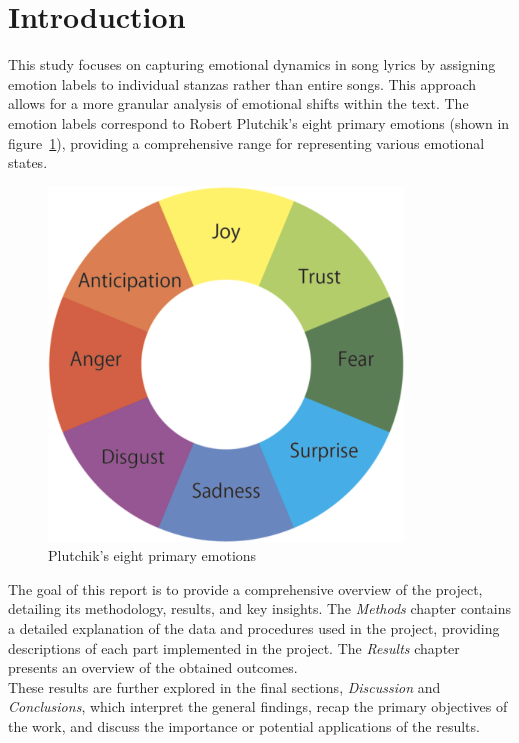 \chapter*{Introduction}
\label{ch:Introduction}
This study focuses on capturing emotional dynamics in song lyrics by assigning
emotion labels to individual stanzas rather than entire songs.
This approach allows for a more granular analysis of emotional shifts within
the text.
The emotion labels correspond to Robert Plutchik's eight primary emotions
(shown in figure~\ref{fig:primary_emotions}), providing a comprehensive range
for representing various emotional states.\\
\begin{figure}[H]
    \centering
    \includegraphics[scale= 0.25]{pictures/plutchik_primary_emotions.png}
    \caption{Plutchik's eight primary emotions}
    \label{fig:primary_emotions}
\end{figure}

The goal of this report is to provide a comprehensive overview of the project,
detailing its methodology, results, and key insights. 
The \textit{Methods} chapter contains a detailed explanation of the data and
procedures used in the project, providing descriptions of each part implemented
in the project.
The \textit{Results} chapter presents an overview of the
obtained outcomes.\\
These results are further explored in the final sections, \textit{Discussion}
and \textit{Conclusions}, which interpret the general findings, recap the
primary objectives of the work, and discuss the importance or potential
applications of the results.